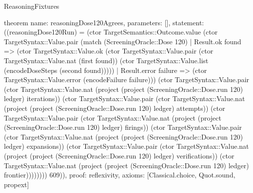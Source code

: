 \begin{lexlean}{ReasoningFixtures}
\begin{semanticmodule}
theorem{
  name: reasoningDose120Agrees,
  parameters: [],
  statement: ((reasoningDose120Run) = (ctor TargetSemantics::Outcome.value (ctor TargetSyntax::Value.pair (match (ScreeningOracle::Dose 120)
    | Result.ok found => (ctor TargetSyntax::Value.ok (ctor TargetSyntax::Value.pair (ctor TargetSyntax::Value.nat (first found)) (ctor TargetSyntax::Value.list (encodeDoseSteps (second found)))))
    | Result.error failure => (ctor TargetSyntax::Value.error (encodeFailure failure))) (ctor TargetSyntax::Value.pair (ctor TargetSyntax::Value.nat (project (project (ScreeningOracle::Dose.run 120) ledger) iterations)) (ctor TargetSyntax::Value.pair (ctor TargetSyntax::Value.nat (project (project (ScreeningOracle::Dose.run 120) ledger) attempts)) (ctor TargetSyntax::Value.pair (ctor TargetSyntax::Value.nat (project (project (ScreeningOracle::Dose.run 120) ledger) firings)) (ctor TargetSyntax::Value.pair (ctor TargetSyntax::Value.nat (project (project (ScreeningOracle::Dose.run 120) ledger) expansions)) (ctor TargetSyntax::Value.pair (ctor TargetSyntax::Value.nat (project (project (ScreeningOracle::Dose.run 120) ledger) verifications)) (ctor TargetSyntax::Value.nat (project (project (ScreeningOracle::Dose.run 120) ledger) frontier)))))))) 609)),
  proof: reflexivity{},
  axioms: [Classical.choice, Quot.sound, propext]
}


\end{semanticmodule}
\end{lexlean}
